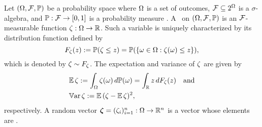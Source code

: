 Let $(\Omega, \mathcal{F}, \mathbb{P})$ be a probability space where $\Omega$ is a set of
outcomes, $\mathcal{F} \subseteq 2^\Omega$ is a $\sigma$-algebra, and
$\mathbb{P}: \mathcal{F} \to [0, 1]$ is a probability measure
\cite{durrett2010}. A \rv\ on $(\Omega, \mathcal{F}, \mathbb{P})$ is an
$\mathcal{F}$-measurable function $\zeta: \Omega \to \mathbb{R}$. Such a variable
is uniquely characterized by its distribution function defined by
\begin{equation*}
  F_\zeta(z) := \mathbb{P}(\zeta \leq z) = \mathbb{P}(\{ \omega \in \Omega: \zeta(\omega) \leq z \}),
\end{equation*}
which is denoted by $\zeta \sim F_\zeta$. The expectation and variance of
$\zeta$ are given by
\begin{align}
  & \expectation{\h} := \int_\outcomes \h(\o) \, d\probabilityMeasure(\o) = \int_\real z \, d \distribution_\h(z) \hspace{1em} \text{and} \elab{expectation} \\
  & \variance{\h} := \expectation{(\h - \expectation{\h})^2}, \nonumber
\end{align}
respectively. A random vector $\bm{\zeta} = (\zeta_i)_{i = 1}^n: \Omega \to \mathbb{R}^n$ is
a vector whose elements are \rvs.
